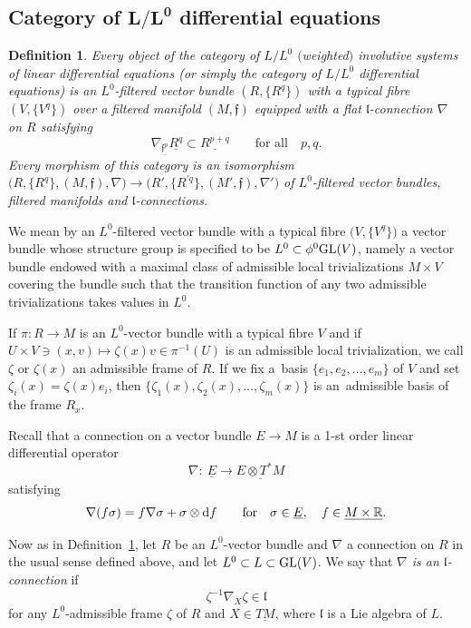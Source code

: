 \documentclass[pdftex]{sigma}%
\newcommand{\R}{\mathbb R}
\newcommand{\f}{\mathfrak f}
\newcommand{\lf}{\mathfrak l}
\newtheorem{df}[thm]{Definition}
\numberwithin{equation}{section}
\begin{document}
\subsection[Category of L/L0 differential equations]
{Category of $\boldsymbol{L/L^0}$ differential equations}
\begin{df}\label{dfn3}
	Every object of \emph{the category of $L/L^0$ $($weighted$)$ involutive systems of linear differential equations} (or simply \emph{the category of $L/L^0$ differential equations}) is an $L^0$-filtered vector bundle $(R,\{R^q\})$ with a typical fibre $(V,\{V^q\})$ over a filtered manifold $(M,\f)$ equipped with a flat $\lf$-connection $\nabla$ on $R$ satisfying
	\[
		\nabla_{\underline{\f^p}} \underline{R^q}\subset \underline{R^{p+q}}\qquad
\text{for all}\quad p,q.
	\]
	Every morphism of this category is an isomorphism $\big(R, \{R^q\}, (M,\f),\nabla\big)\! \to \! \big(R', \{R^{\prime q}\}, (M',\f),\nabla'\big)$ of $L^0$-filtered vector bundles, filtered manifolds and $\lf$-connections.
\end{df}

We mean by an $L^0$-filtered vector bundle with a typical fibre $\big(V,\{V^q\}\big)$ a vector bundle whose structure group is specified to be $L^0\subset \phi^0 {\rm GL}(V)$, namely a vector bundle endowed with a maximal class of admissible local trivializations $M\times V$ covering the bundle such that the transition function of any two admissible trivializations takes values in $L^0$.

If $\pi\colon R\to M$ is an $L^0$-vector bundle with a typical fibre $V$ and if $U\times V\ni (x,v)\mapsto \zeta(x)v\in\pi^{-1}(U)$ is an admissible local trivialization, we call $\zeta$ or $\zeta(x)$ an admissible frame of $R$. If we fix a~basis $\{e_1,e_2,\dots,e_m\}$ of $V$ and set $\zeta_i(x)= \zeta(x)e_i$, then $\{\zeta_1(x),\zeta_2(x),\dots,\zeta_m(x)\}$ is an~admissible basis of the frame $R_x$.

Recall that a connection on a vector bundle $E\to M$ is a 1-st order linear differential operator
\[
\nabla \colon\ \underline{E} \to \underline{E\otimes T^*M}
\]
satisfying
\[
\nabla(f\sigma) = f\nabla\sigma + \sigma\otimes {\rm d}f\qquad \text{for}\quad
\sigma\in\underline{E},\quad f\in \underline{M\times \R}.
\]

Now as in Definition~\ref{dfn3}, let $R$ be an $L^0$-vector bundle and $\nabla$ a connection on $R$ in the usual sense defined above, and let $L^0\subset L\subset {\rm GL}(V)$. We say that \emph{$\nabla$ is an $\lf$-connection} if
\[
	\zeta^{-1}\nabla_X\zeta \in\lf
\]
for any $L^0$-admissible frame $\zeta$ of $R$ and $X\in\underline{TM}$, where $\lf$ is a Lie algebra of $L$.
\end{document}
